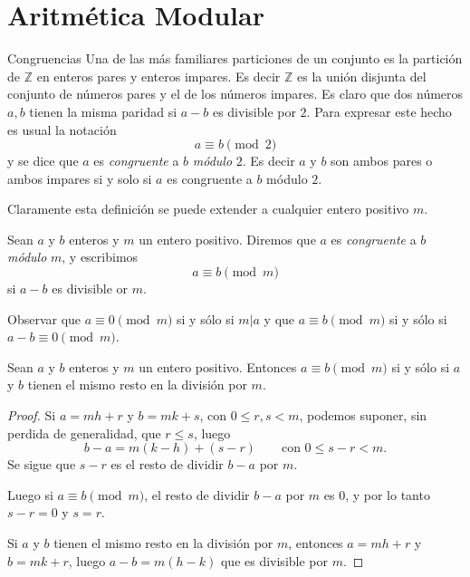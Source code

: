 \chapter[Aritmética Modular]{Aritmética Modular}\label{cap.aritmetica_modular}

\begin{section}{Congruencias}\label{seccion-congruencias}
Una de las más familiares particiones de un conjunto es la partición de $\mathbb Z$ en enteros pares y enteros impares. Es decir $\mathbb Z$ es la unión disjunta del conjunto de números pares y el de los números impares. Es claro que dos números $a,b$ tienen la misma paridad si $a-b$ es divisible por $2$. Para expresar este hecho es usual la notación
$$
a\equiv b \pmod2
$$
y se dice que $a$ es \textit{congruente } a $b$ \textit{módulo} $2$. Es decir $a$ y $b$ son ambos pares o ambos impares si y solo si $a$ es congruente a $b$ módulo $2$.

Claramente esta definición se puede extender a cualquier entero positivo $m$.

\begin{definicion} Sean $a$ y $b$ enteros y $m$ un entero positivo. Diremos que $a$ es {\em congruente} a $b$  {\em módulo} $m$, y escribimos  
$$
a \equiv b \pmod{m}
$$
si $a-b$ es divisible or $m$.
\end{definicion}

Observar que $a\equiv 0 \pmod{m}$ si  y sólo si $m|a$ y que $a\equiv b \pmod{m}$ si y sólo si $a-b\equiv 0 \pmod{m}$. 


\begin{proposicion}
Sean $a$ y $b$ enteros y $m$ un entero positivo. Entonces $a\equiv b \pmod{m}$ si  y sólo si $a$ y $b$ tienen el mismo resto en la división por $m$.
\end{proposicion}
\begin{proof}
Si $a=mh+r$ y $b=mk+s$, con $0 \le r,s <m$, podemos suponer, sin perdida de generalidad, que $r \le s$, luego
$$
b-a= m(k-h) + (s-r) \qquad \text{con $0\le s - r < m$}.
$$
Se sigue que $s-r$ es el resto de dividir $b-a$ por $m$.

Luego si $a\equiv b \pmod{m}$, el resto de dividir   $b-a$ por $m$ es 0, y por lo tanto $s-r=0$ y $s=r$.

Si $a$ y $b$ tienen el mismo resto en la división por $m$, entonces  $a=mh+r$ y $b=mk+r$, luego $a-b = m(h-k)$ que es divisible por $m$.
\end{proof}


\end{section}
